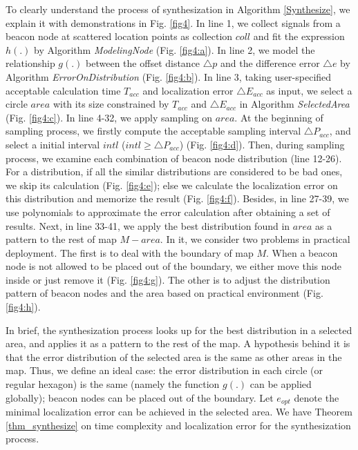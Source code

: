 \documentclass[10pt, conference, letterpaper]{IEEEtran}
\begin{document}
To clearly understand the process of synthesization in Algorithm \ref{Synthesize}, we explain it with demonstrations in Fig. \ref{fig4}. In line 1, we collect signals from a beacon node at scattered location points as collection $coll$ and fit the expression $h(.)$ by Algorithm \textit{ModelingNode} (Fig. \ref{fig4:a}). In line 2, we model the relationship $g(.)$ between the offset distance $\triangle p$ and the difference error $\triangle e$ by Algorithm \textit{ErrorOnDistribution} (Fig. \ref{fig4:b}). In line 3, taking user-specified acceptable calculation time $T_{acc}$ and localization error $\triangle E_{acc}$ as input, we select a circle $area$ with its size constrained by $T_{acc}$ and $\triangle E_{acc}$ in Algorithm \textit{SelectedArea} (Fig. \ref{fig4:c}). In line 4-32, we apply sampling on $area$. At the beginning of  sampling process, we firstly compute the acceptable sampling interval $\triangle P_{acc}$, and select a initial interval $intl$ ($intl \geq \triangle P_{acc}$) (Fig. \ref{fig4:d}). Then, during sampling process, we examine each combination of beacon node distribution (line 12-26). For a distribution, if all the similar distributions are considered to be bad ones, we skip its calculation (Fig. \ref{fig4:e}); else we calculate the localization error on this distribution and memorize the result (Fig. \ref{fig4:f}). Besides, in line 27-39, we use polynomials to approximate the error calculation after obtaining a set of results. Next, in line 33-41, we apply the best distribution found in $area$ as a pattern to the rest of map $M-area$. In it, we consider two problems in practical deployment. The first is to deal with the boundary of map $M$. When a beacon node is not allowed to be placed out of the boundary, we either move this node inside or just remove it (Fig. \ref{fig4:g}). The other is to adjust the distribution pattern of beacon nodes and the area based on practical environment (Fig. \ref{fig4:h}).

In brief, the synthesization process looks up for the best distribution in a selected area, and applies it as a pattern to the rest of the map. A hypothesis behind it is that the error distribution of the selected area is the same as other areas in the map. Thus, we define an ideal case: the error distribution in each circle (or regular hexagon) is the same (namely the function $g(.)$ can be applied globally); beacon nodes can be placed out of the boundary. Let $e_{opt}$ denote the minimal localization error can be achieved in the selected area. We have Theorem \ref{thm_synthesize} on time complexity and localization error for the synthesization process.
\end{document}
